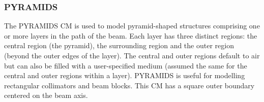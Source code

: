\documentclass[12pt,twoside]{article}
\begin{document}
\begin{small}

\end{small}



\clearpage

\subsubsection{PYRAMIDS}
\renewcommand{\rightmark}{PYRAMIDS CM}
The PYRAMIDS CM is used to model pyramid-shaped structures comprising
one or more layers in the path of
the beam.  Each layer has three distinct regions: the central region
(the pyramid), the
surrounding region and the outer region (beyond the outer edges of the layer).
The central and outer regions default to air but can also be filled
with a user-specified medium (assumed the same for the central and outer
regions within a layer).
PYRAMIDS is useful for modelling rectangular collimators and beam blocks.
This CM has a square outer boundary centered on
the beam axis.
\end{document}
